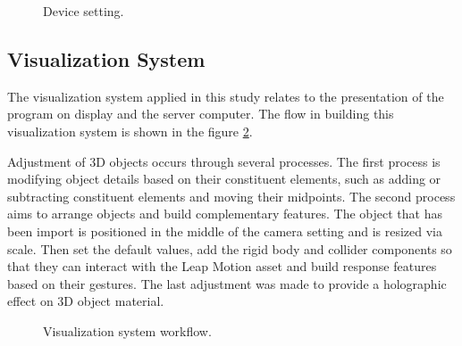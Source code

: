 \documentclass[conference]{IEEEtran}
\begin{document}
		\vspace{-4ex}
		\begin{figure}[h]
			\caption{Device setting.}
			\label{fig:foto_alat}
		\end{figure}
		\vspace{-2ex}
	
	\subsection{Visualization System}
		The visualization system applied in this study relates to the presentation of the program on display and the server computer. The flow in building this visualization system is shown in the figure \ref{fig:desain_visualisasi}.
		
		Adjustment of 3D objects occurs through several processes. The first process is modifying object details based on their constituent elements, such as adding or subtracting constituent elements and moving their midpoints. The second process aims to arrange objects and build complementary features. The object that has been import is positioned in the middle of the camera setting and is resized via scale. Then set the default values, add the rigid body and collider components so that they can interact with the Leap Motion asset and build response features based on their gestures. The last adjustment was made to provide a holographic effect on 3D object material. 
		
		\vspace{-2ex}
		\begin{figure}[h]
			\caption{Visualization system workflow.}
			\label{fig:desain_visualisasi}
			\vspace{-4ex}
		\end{figure}
\end{document}
